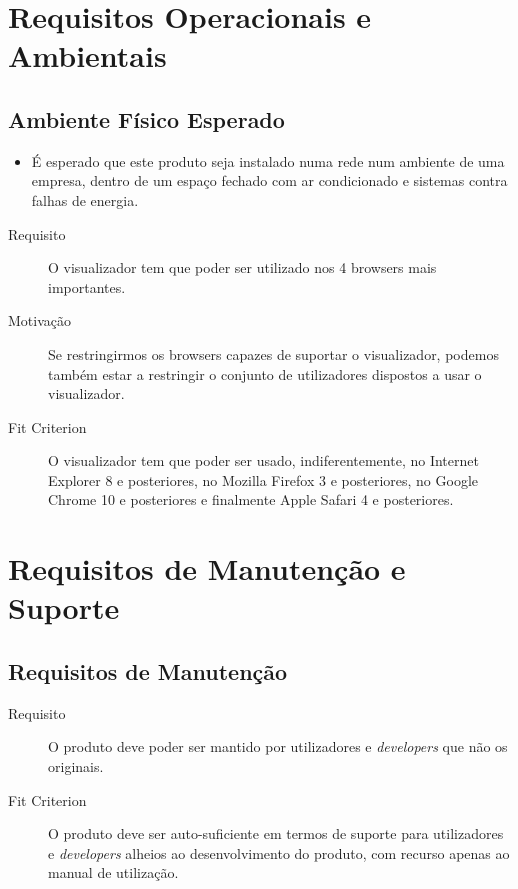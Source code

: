 \section{Requisitos Operacionais e Ambientais}
\subsection{Ambiente Físico Esperado}
\begin{itemize}
\item É esperado que este produto seja instalado numa rede num ambiente de uma empresa, dentro de um espaço fechado com ar condicionado e sistemas contra falhas de energia.
\end{itemize}




\begin{description}
\item[Requisito] O visualizador tem que poder ser utilizado nos 4 browsers mais importantes.
\item[Motivação] Se restringirmos os browsers capazes de suportar o visualizador, podemos também estar a restringir 
o conjunto de utilizadores dispostos a usar o visualizador.
\item[Fit Criterion] O visualizador tem que poder ser usado, indiferentemente, no Internet Explorer 8 e posteriores, no Mozilla Firefox 3 e 
posteriores, no Google Chrome 10 e posteriores e finalmente Apple Safari 4 e posteriores.
\end{description}


\section{Requisitos de Manutenção e Suporte}
\subsection{Requisitos de Manutenção}
\begin{description}
\item[Requisito] O produto deve poder ser mantido por utilizadores e \emph{developers} que não os originais.
\item[Fit Criterion] O produto deve ser auto-suficiente em termos de suporte para utilizadores e \emph{developers} alheios ao desenvolvimento 
do produto, com recurso apenas ao manual de utilização.
\end{description}

